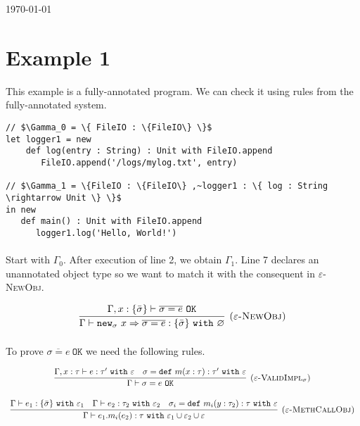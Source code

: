 \documentclass{llncs}
\newcommand{\keywadj}[1]{\mathtt{#1}}
\newcommand{\keyw}[1]{\keywadj{#1}~}
\begin{document}
\today

\section{Example 1}
This example is a fully-annotated program. We can check it using rules from the fully-annotated system.\\

\vspace{-6pt}
\begin{lstlisting}[xleftmargin=20pt]
// $\Gamma_0 = \{ FileIO : \{FileIO\} \}$
let logger1 = new
    def log(entry : String) : Unit with FileIO.append
       FileIO.append('/logs/mylog.txt', entry)
 
// $\Gamma_1 = \{FileIO : \{FileIO\} ,~logger1 : \{ log : String \rightarrow Unit \} \}$
in new
   def main() : Unit with FileIO.append
      logger1.log('Hello, World!')
\end{lstlisting}

\paragraph{}
Start with $\Gamma_0 $. After execution of line 2, we obtain $\Gamma_1$. Line 7 declares an unannotated object type so we want to match it with the consequent in \textsc{$\varepsilon$-NewObj}.

\[
\begin{array}{c}
\infer[\textsc{($\varepsilon$-NewObj)}]
	{\Gamma \vdash \keywadj{new}_\sigma~x \Rightarrow \overline{\sigma = e} : \{ \bar \sigma \}~\keyw{with} \varnothing}
	{\Gamma, x : \{ \bar \sigma \} \vdash \overline{\sigma = e}~\keywadj{OK}} \\
\end{array}
\]

\paragraph{}
To prove $\overline {\sigma = e}~\keywadj{OK}$ we need the following rules.

\[
\begin{array}{c}
\infer[\textsc{($\varepsilon$-ValidImpl$_\sigma$)}]
	{\Gamma \vdash \sigma = e~\keywadj{OK}}
	{\Gamma, x:\tau \vdash e: \tau'~\keyw{with} \varepsilon & \sigma = \keyw{def} m(x:\tau):\tau'~\keyw{with} \varepsilon} \\[3ex]
	
\infer[\textsc{($\varepsilon$-MethCallObj)}]
	{\Gamma \vdash e_1.m_i(e_2):\tau~\keyw{with} \varepsilon_1 \cup \varepsilon_2 \cup \varepsilon}
	{\Gamma \vdash e_1 : \{ \bar \sigma \}~\keyw{with} \varepsilon_1 & \Gamma \vdash e_2 : \tau_2~\keyw{with} \varepsilon_2 & \sigma_i = \keyw{def} m_i(y:\tau_2):\tau~\keyw{with} \varepsilon}

\end{array}
\]
\end{document}
